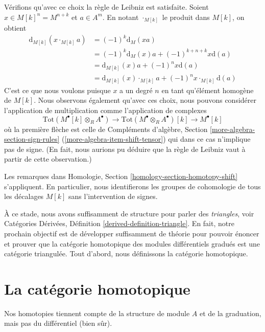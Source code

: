 \noindent
Vérifions qu'avec ce choix la règle de Leibniz est satisfaite. Soient $x \in
M[k]^n = M^{n + k}$ et $a \in A^m$. En notant $\cdot_{M[k]}$ le produit dans
$M[k]$, on obtient
\begin{align*}
\text{d}_{M[k]}(x \cdot_{M[k]} a)
& =
(-1)^k \text{d}_M(xa) \\
& =
(-1)^k \text{d}_M(x) a + (-1)^{k + n + k} x \text{d}(a) \\
& =
\text{d}_{M[k]}(x) a + (-1)^n x \text{d}(a) \\
& =
\text{d}_{M[k]}(x) \cdot_{M[k]} a + (-1)^n x \cdot_{M[k]} \text{d}(a)
\end{align*}
C'est ce que nous voulons puisque $x$ a un degré $n$ en tant qu'élément homogène
de $M[k]$. Nous observons également qu'avec ces choix, nous pouvons considérer
l'application de multiplication comme l'application de complexes
$$
\text{Tot}(M^\bullet[k] \otimes _R A^\bullet) \to
\text{Tot}(M^\bullet \otimes _R A^\bullet)[k] \to
M^\bullet[k]
$$
où la première flèche est celle de Compléments d'algèbre, Section
\ref{more-algebra-section-sign-rules} (\ref{more-algebra-item-shift-tensor}) qui
dans ce cas n'implique pas de signe. (En fait, nous aurions pu déduire que la
règle de Leibniz vaut à partir de cette observation.)

\medskip\noindent
Les remarques dans Homologie, Section \ref{homology-section-homotopy-shift}
s'appliquent. En particulier, nous identifierons les groupes de cohomologie de
tous les décalages $M[k]$ sans l'intervention de signes.

\medskip\noindent
À ce stade, nous avons suffisamment de structure pour parler des {\it triangles},
voir Catégories Dérivées, Définition \ref{derived-definition-triangle}. En fait,
notre prochain objectif est de développer suffisamment de théorie pour pouvoir
énoncer et prouver que la catégorie homotopique des modules différentiels gradués
est une catégorie triangulée. Tout d'abord, nous définissons la catégorie
homotopique.






\section{La catégorie homotopique}
\label{section-homotopy}

\noindent
Nos homotopies tiennent compte de la structure de module $A$ et de la graduation,
mais pas du différentiel (bien sûr).

